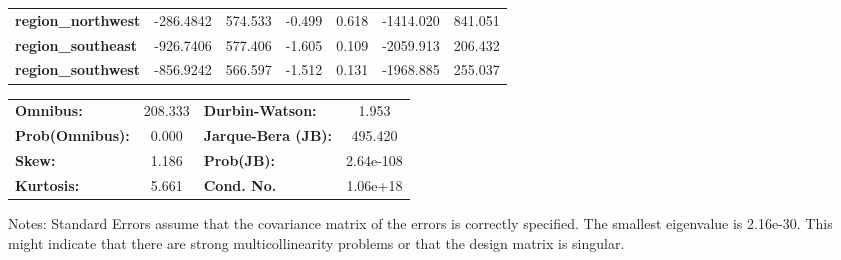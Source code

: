 \begin{center}
\begin{tabular}{lcccccc}
\textbf{region\_northwest} &    -286.4842  &      574.533     &    -0.499  &         0.618        &    -1414.020    &      841.051     \\
\textbf{region\_southeast} &    -926.7406  &      577.406     &    -1.605  &         0.109        &    -2059.913    &      206.432     \\
\textbf{region\_southwest} &    -856.9242  &      566.597     &    -1.512  &         0.131        &    -1968.885    &      255.037     \\
\bottomrule
\end{tabular}
\begin{tabular}{lclc}
\textbf{Omnibus:}       & 208.333 & \textbf{  Durbin-Watson:     } &     1.953  \\
\textbf{Prob(Omnibus):} &   0.000 & \textbf{  Jarque-Bera (JB):  } &   495.420  \\
\textbf{Skew:}          &   1.186 & \textbf{  Prob(JB):          } & 2.64e-108  \\
\textbf{Kurtosis:}      &   5.661 & \textbf{  Cond. No.          } &  1.06e+18  \\
\bottomrule
\end{tabular}
\end{center}

Notes: \newline
 [1] Standard Errors assume that the covariance matrix of the errors is correctly specified. \newline
 [2] The smallest eigenvalue is 2.16e-30. This might indicate that there are \newline
 strong multicollinearity problems or that the design matrix is singular.